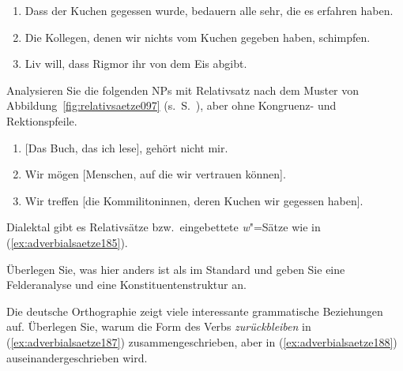 \begin{enumerate}
  \item Dass der Kuchen gegessen wurde, bedauern alle sehr, die es erfahren haben.
  \item Die Kollegen, denen wir nichts vom Kuchen gegeben haben, schimpfen.
  \item Liv will, dass Rigmor ihr von dem Eis abgibt.
\end{enumerate}

 \label{exc:saetze05} Analysieren Sie die folgenden NPs mit Relativsatz nach dem Muster von Abbildung~\ref{fig:relativsaetze097} (s.\ S.~\pageref{fig:relativsaetze097}), aber ohne Kongruenz- und Rektionspfeile.

\begin{enumerate}
  \item{[Das Buch, das ich lese], gehört nicht mir.}
  \item Wir mögen [Menschen, auf die wir vertrauen können].
  \item Wir treffen [die Kommilitoninnen, deren Kuchen wir gegessen haben].
\end{enumerate}

 \label{exc:saetze06} Dialektal gibt es Relativsätze bzw.\ eingebettete \textit{w}"=Sätze wie in (\ref{ex:adverbialsaetze185}).

\begin{exe}
\end{exe}

Überlegen Sie, was hier anders ist als im Standard und geben Sie eine Felderanalyse und eine Konstituentenstruktur an.

 \label{exc:saetze07} Die deutsche Orthographie zeigt viele interessante grammatische Beziehungen auf.
Überlegen Sie, warum die Form des Verbs \textit{zurückbleiben} in (\ref{ex:adverbialsaetze187}) zusammengeschrieben, aber in (\ref{ex:adverbialsaetze188}) auseinandergeschrieben wird.

\begin{exe}
  \ex\label{ex:adverbialsaetze186}
  \begin{xlist}
  \end{xlist}
\end{exe}

